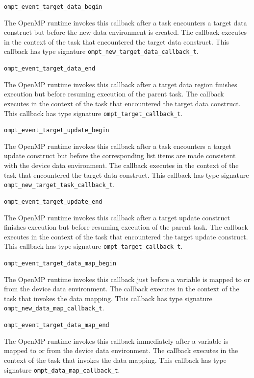 \documentclass{article}
\begin{document}
\begin{description}

\item \verb|ompt_event_target_data_begin|

  The OpenMP runtime invokes this callback after a task encounters a target data construct but before the new data environment is created.
  The callback executes in the context of the task that encountered the target data construct.
  This callback has type signature \verb|ompt_new_target_data_callback_t|.

\item \verb|ompt_event_target_data_end|

  The OpenMP runtime invokes this callback after a target data region finishes execution but before resuming execution of the parent task.
  The callback executes in the context of the task that encountered the target data construct.
  This callback has type signature \verb|ompt_target_callback_t|.

\item \verb|ompt_event_target_update_begin|

  The OpenMP runtime invokes this callback after a task encounters a target update construct but before the corresponding
  list items are made consistent with the device data environment.
  The callback executes in the context of the task that encountered the target data construct.
  This callback has type signature \verb|ompt_new_target_task_callback_t|.

\item \verb|ompt_event_target_update_end|

  The OpenMP runtime invokes this callback after a target update construct finishes execution but before resuming execution of the parent task.
  The callback executes in the context of the task that encountered the target update construct.
  This callback has type signature \verb|ompt_target_callback_t|.

\item \verb|ompt_event_target_data_map_begin|

  The OpenMP runtime invokes this callback just before a variable is mapped to or from the device data environment.
  The callback executes in the context of the task that invokes the data mapping.
  This callback has type signature \verb|ompt_new_data_map_callback_t|.

\item \verb|ompt_event_target_data_map_end|

  The OpenMP runtime invokes this callback immediately after a variable is mapped to or from the device data environment.
  The callback executes in the context of the task that invokes the data mapping.
  This callback has type signature \verb|ompt_data_map_callback_t|.


\end{description}
\end{document}
